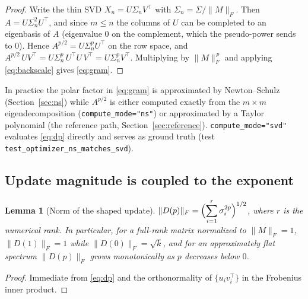 \documentclass{article}
\newtheorem{lemma}{Lemma}
\begin{document}
\begin{proof}
Write the thin SVD $X_n = U \Sigma_n V^\top$ with
$\Sigma_n = \Sigma / \|M\|_F$. Then $A = U \Sigma_n^2 U^\top$, and since
$m \le n$ the columns of $U$ can be completed to an eigenbasis of $A$
(eigenvalue $0$ on the complement, which the pseudo-power sends to $0$).
Hence $A^{p/2} = U \Sigma_n^{p} U^\top$ on the row space, and
$A^{p/2}\, U V^\top = U \Sigma_n^{p}\, U^\top U\, V^\top
= U \Sigma_n^{p} V^\top$. Multiplying by $\|M\|_F^{\,p}$ and applying
\eqref{eq:backscale} gives \eqref{eq:gram}.
\end{proof}

In practice the polar factor in \eqref{eq:gram} is approximated by
Newton--Schulz (Section~\ref{sec:ns}) while $A^{p/2}$ is either computed
exactly from the $m\times m$ eigendecomposition (\texttt{compute\_mode="ns"})
or approximated by a Taylor polynomial (the reference path,
Section~\ref{sec:reference}). \texttt{compute\_mode="svd"} evaluates
\eqref{eq:dp} directly and serves as ground truth
(test \texttt{test\_optimizer\_ns\_matches\_svd}).

\subsection{Update magnitude is coupled to the exponent}
\label{sec:magnitude}

\begin{lemma}[Norm of the shaped update]
\label{lem:norm}
$\displaystyle \|D(p)\|_F = \Bigl(\sum_{i=1}^{r} \sigma_i^{2p}\Bigr)^{1/2}$,
where $r$ is the numerical rank. In particular, for a full-rank matrix
normalized to $\|M\|_F = 1$,
$\|D(1)\|_F = 1$ while $\|D(0)\|_F = \sqrt{k}$, and for an approximately flat
spectrum $\|D(p)\|_F$ grows monotonically as $p$ decreases below $0$.
\end{lemma}

\begin{proof}
Immediate from \eqref{eq:dp} and the orthonormality of $\{u_i v_i^\top\}$ in
the Frobenius inner product.
\end{proof}
\end{document}
